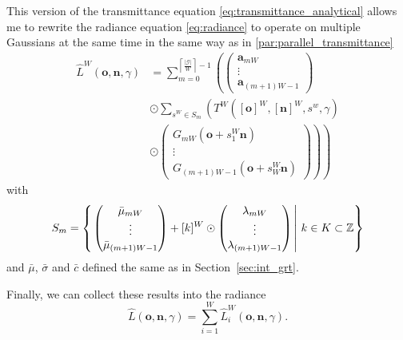 \documentclass[a4paper, 11pt]{memoir}
\begin{document}
    This version of the \gls{transmittance} equation \eqref{eq:transmittance_analytical} allows me to rewrite the \gls{radiance} equation
    \eqref{eq:radiance} to operate on multiple Gaussians at the same time in the same way as in \ref{par:parallel_transmittance}
    \begin{equation}
        \begin{aligned}
            \hat{L}^W(\mathbf{o}, \mathbf{n}, \gamma) &= \sum_{m = 0}^{\left\lceil \frac{|\mathcal{G}|}{W} \right\rceil - 1} \left( \begin{pmatrix}
                \mathbf{a}_{mW}\\ \vdots \\ \mathbf{a}_{(m+1)W - 1}
            \end{pmatrix} \right.\\
            &\odot \sum_{s^W \in S_m} \left( T^W([\mathbf{o}]^W, [\mathbf{n}]^W, s^w, \gamma)\right.\\
            &\odot \left.\left.\begin{pmatrix}
                G_{mW}(\mathbf{o} + s^W_1\mathbf{n})\\ \vdots\\ G_{(m+1)W - 1}(\mathbf{o} + s^W_W\mathbf{n})
            \end{pmatrix}\right)\right)
        \end{aligned}
        \label{eq:radiance_parallel_gaussians}
    \end{equation}
    with
    \[ S_m = \left\{\left. \begin{pmatrix}
        \bar{\mu}_{mW}\\ \vdots\\ \bar{\mu}_{(m+1)W - 1}
    \end{pmatrix} + [k]^W \odot \begin{pmatrix}
        \lambda_{mW}\\ \vdots\\ \lambda_{(m+1)W - 1}
    \end{pmatrix} \,\right|\, k \in K \subset \mathbb{Z} \right\} \]
    and $\bar{\mu}$, $\bar{\sigma}$ and $\bar{c}$ defined the same as in Section~\ref{sec:int_grt}.

    Finally, we can collect these results into the \gls{radiance}
    \begin{equation}
        \hat{L}(\mathbf{o}, \mathbf{n}, \gamma) = \sum_{i = 1}^W \hat{L}^W_i(\mathbf{o}, \mathbf{n}, \gamma).
        \label{eq:radiance_parallel_final}
    \end{equation}
\end{document}
